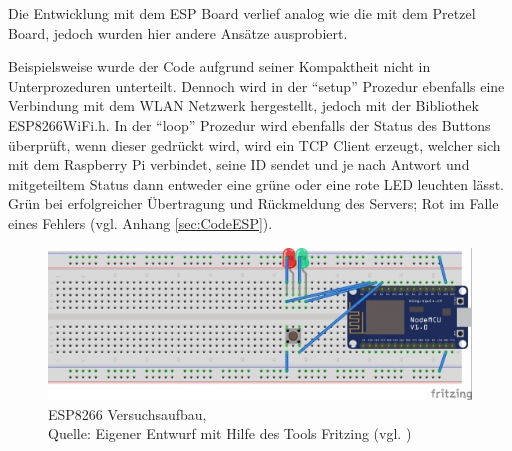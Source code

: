 Die Entwicklung mit dem ESP Board verlief analog wie die mit dem Pretzel Board, jedoch wurden hier andere Ansätze ausprobiert.

Beispielsweise wurde der Code aufgrund seiner Kompaktheit nicht in Unterprozeduren unterteilt.
Dennoch wird in der "`setup"' Prozedur ebenfalls eine Verbindung mit dem \ac{WLAN} Netzwerk hergestellt, jedoch mit der Bibliothek ESP8266WiFi.h.
In der "`loop"' Prozedur wird ebenfalls der Status des Buttons überprüft, wenn dieser gedrückt wird, wird ein \ac{TCP} Client erzeugt, welcher sich mit dem Raspberry Pi verbindet, seine ID sendet und je nach Antwort und mitgeteiltem Status dann entweder eine grüne oder eine rote LED leuchten lässt. Grün bei erfolgreicher Übertragung und Rückmeldung des Servers; Rot im Falle eines Fehlers (vgl. Anhang \ref{sec:CodeESP}).
\begin{figure}[H]
	\centering
	\includegraphics[scale=1.5]{ESP_Fritzing.jpg}
	\caption[ESP8266 Versuchsaufbau]{ESP8266 Versuchsaufbau,\\ Quelle: Eigener Entwurf mit Hilfe des Tools Fritzing (vgl. \cite{.fritz})}
\end{figure}